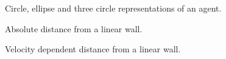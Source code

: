\documentclass[]{article}
\begin{document}
\begin{multicols*}{2}

\end{multicols*}

\newpage



\begin{figure}[H]
\centering
\begin{tikzpicture}


\end{tikzpicture}
\caption{Circle, ellipse and three circle representations of an agent.}
\end{figure}

\newpage

\begin{multicols*}{2}

\end{multicols*}


\newpage


\begin{figure}[H]
\centering
\begin{tikzpicture}


\end{tikzpicture}
\caption{Absolute distance from a linear wall.}
\end{figure}

\begin{figure}[H]
\centering
\begin{tikzpicture}


\end{tikzpicture}
\caption{Velocity dependent distance from a linear wall.}
\end{figure}


\begin{multicols*}{2}

\end{multicols*}

\newpage


\begin{multicols*}{2}





\end{multicols*}

\end{document}
